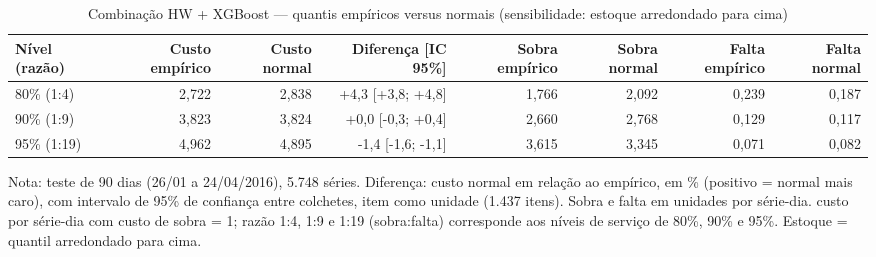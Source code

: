 \begin{table}[htbp]
\centering
\small
\caption{Combinação HW + XGBoost — quantis empíricos versus normais (sensibilidade: estoque arredondado para cima)}
\label{tab:comb_empirico_vs_normal_sensibilidade}
\begin{tabular}{lrrrrrrr}
\toprule
Nível (razão) & Custo empírico & Custo normal & Diferença [IC 95\%] & Sobra empírico & Sobra normal & Falta empírico & Falta normal \\
\midrule
80\% (1:4) & 2,722 & 2,838 & +4,3 [+3,8; +4,8] & 1,766 & 2,092 & 0,239 & 0,187 \\
90\% (1:9) & 3,823 & 3,824 & +0,0 [-0,3; +0,4] & 2,660 & 2,768 & 0,129 & 0,117 \\
95\% (1:19) & 4,962 & 4,895 & -1,4 [-1,6; -1,1] & 3,615 & 3,345 & 0,071 & 0,082 \\
\bottomrule
\end{tabular}
\par\smallskip
{\footnotesize Nota: teste de 90 dias (26/01 a 24/04/2016), 5.748 séries. Diferença: custo normal em relação ao empírico, em \% (positivo = normal mais caro), com intervalo de 95\% de confiança entre colchetes, item como unidade (1.437 itens). Sobra e falta em unidades por série-dia. custo por série-dia com custo de sobra = 1; razão 1:4, 1:9 e 1:19 (sobra:falta) corresponde aos níveis de serviço de 80\%, 90\% e 95\%. Estoque = quantil arredondado para cima.}
\end{table}
